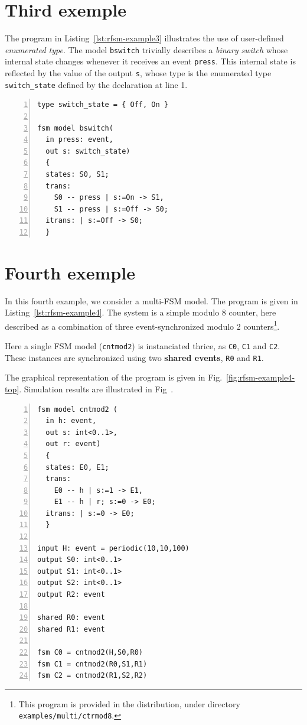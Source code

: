 \section{Third exemple}
\label{sec:third-exemple}

The program in Listing~\ref{lst:rfsm-example3} illustrates the use of user-defined \emph{enumerated
  type}. The model \verb|bswitch| trivially describes a \emph{binary switch} whose internal state changes
whenever it receives an event \verb|press|. This internal state is reflected by the value of the
output \verb|s|, whose type is the enumerated type \verb|switch_state| defined by the declaration at
line 1.

\begin{lstlisting}[language=Rfsm,frame=single,numbers=left,caption=An RFSM program using a
  user-defined enumerated type,label={lst:rfsm-example3},float]
type switch_state = { Off, On }
  
fsm model bswitch(
  in press: event,
  out s: switch_state)
  {
  states: S0, S1;
  trans: 
    S0 -- press | s:=On -> S1,
    S1 -- press | s:=Off -> S0;
  itrans: | s:=Off -> S0;
  }
\end{lstlisting}

\section{Fourth exemple}
\label{sec:fourth-exemple}

In this fourth example, we consider a multi-FSM model. The program is given in
Listing~\ref{lst:rfsm-example4}. The system is a simple modulo 8 counter, here described as a
combination of three event-synchronized modulo 2 counters\footnote{This program is provided in the
  distribution, under directory \texttt{examples/multi/ctrmod8}.}.

\medskip
Here a single FSM model (\texttt{cntmod2}) is instanciated thrice, as \texttt{C0}, \texttt{C1} and
\texttt{C2}. These instances are synchronized using two \textbf{shared events}, \texttt{R0} and \texttt{R1}. 

\medskip
The graphical representation of the program is given in Fig.~\ref{fig:rfsm-example4-top}. Simulation
results are illustrated in Fig~\pageref{fig:rfsm-example4-vcd}. 

\begin{lstlisting}[language=Rfsm,frame=single,numbers=left,caption=A multi-model RFSM
  program,label={lst:rfsm-example4},float]
fsm model cntmod2 (
  in h: event,
  out s: int<0..1>,
  out r: event)
  {
  states: E0, E1;
  trans:
    E0 -- h | s:=1 -> E1,
    E1 -- h | r; s:=0 -> E0;
  itrans: | s:=0 -> E0;
  }

input H: event = periodic(10,10,100)
output S0: int<0..1>
output S1: int<0..1>
output S2: int<0..1>
output R2: event

shared R0: event
shared R1: event

fsm C0 = cntmod2(H,S0,R0) 
fsm C1 = cntmod2(R0,S1,R1) 
fsm C2 = cntmod2(R1,S2,R2) 
\end{lstlisting}

